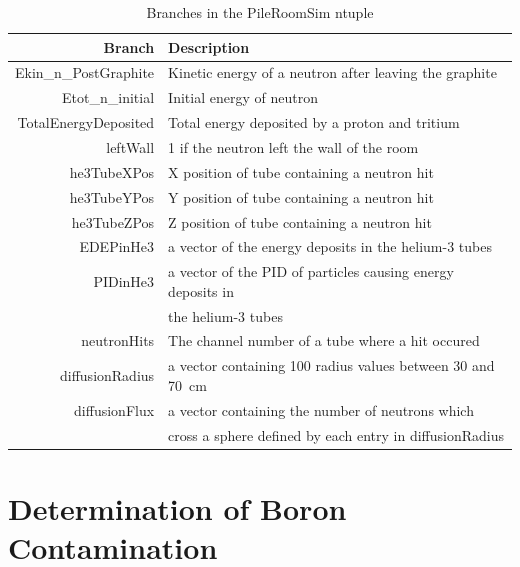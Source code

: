 \documentclass{article}
\begin{document}
	
\begin{table}[ht]
	\centering
	\begin{tabular}{ rl }
		Branch	&	Description	\\	\hline	\hline
Ekin\_n\_PostGraphite	&	Kinetic energy of a neutron after leaving the graphite	\\		
Etot\_n\_initial	&	Initial energy of neutron	\\		
TotalEnergyDeposited	&	Total energy deposited by a proton and tritium	\\		
leftWall	&	1 if the neutron left the wall of the room	\\		
he3TubeXPos	&	X position of tube containing a neutron hit	\\		
he3TubeYPos	&	Y position of tube containing a neutron hit	\\		
he3TubeZPos	&	Z position of tube containing a neutron hit	\\		
EDEPinHe3	&	a vector of the energy deposits in the helium-3 tubes	\\		
PIDinHe3	&	a vector of the PID of particles causing energy deposits in 	\\		
	&	the helium-3 tubes	\\		
neutronHits	&	The channel number of a tube where a hit occured	\\		
diffusionRadius	&	a vector containing 100 radius values between 30 and 70~cm	\\		
diffusionFlux	&	a vector containing the number of neutrons which 	\\		
	&	cross a sphere defined by each entry in diffusionRadius	\\	\hline	

	
	\end{tabular}
	\caption{Branches in the PileRoomSim ntuple}
	\label{tab:branches}
\end{table}	




\section{Determination of Boron Contamination}











\clearpage
	
	
\end{document}
